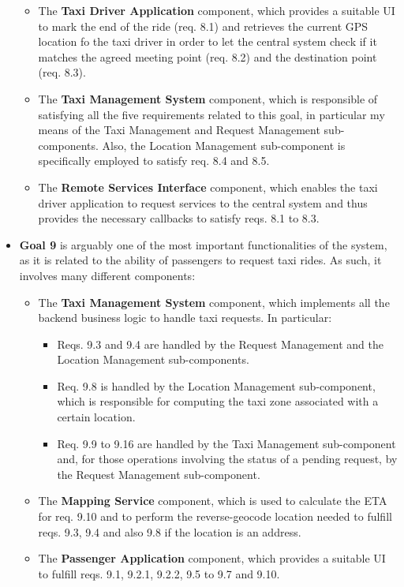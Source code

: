 \begin{itemize}
	\begin{itemize}
	\item The \textbf{Taxi Driver Application} component, which provides a suitable UI to mark the end of the ride (req. 8.1) and retrieves the current GPS location fo the taxi driver in order to let the central system check if it matches the agreed meeting point (req. 8.2) and the destination point (req. 8.3).
	\item The \textbf{Taxi Management System} component, which is responsible of satisfying all the five requirements related to this goal, in particular my means of the Taxi Management and Request Management sub-components. Also, the Location Management sub-component is specifically employed to satisfy req. 8.4 and 8.5.
	\item The \textbf{Remote Services Interface} component, which enables the taxi driver application to request services to the central system and thus provides the necessary callbacks to satisfy reqs. 8.1 to 8.3.
	\end{itemize}
	\item \textbf{Goal 9} is arguably one of the most important functionalities of the system, as it is related to the ability of passengers to request taxi rides. As such, it involves many different components:
	\begin{itemize}
		\item The \textbf{Taxi Management System} component, which implements all the backend business logic to handle taxi requests. In particular:
		\begin{itemize}
		\item Reqs. 9.3 and 9.4 are handled by the Request Management and the Location Management sub-components.
		\item Req. 9.8 is handled by the Location Management sub-component, which is responsible for computing the taxi zone associated with a certain location.
		\item Req. 9.9 to 9.16 are handled by the Taxi Management sub-component and, for those operations involving the status of a pending request, by the Request Management sub-component.
		\end{itemize}
		\item The \textbf{Mapping Service} component, which is used to calculate the ETA for req. 9.10 and to perform the reverse-geocode location needed to fulfill reqs. 9.3, 9.4 and also 9.8 if the location is an address.
		\item The \textbf{Passenger Application} component, which provides a suitable UI to fulfill reqs. 9.1, 9.2.1, 9.2.2, 9.5 to 9.7 and 9.10.

\end{itemize}
\end{itemize}
